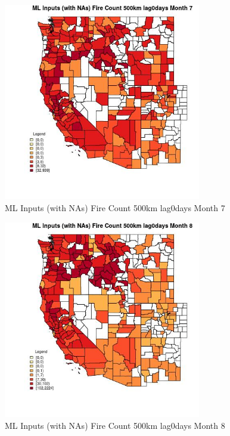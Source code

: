 \begin{figure} 
\centering  
\includegraphics[width=0.77\textwidth]{Code_Outputs/Report_ML_input_PM25_Step4_part_e_de_duplicated_aves_compiled_2019-05-20wNAs_CountyFire_Count_500km_lag0daysmedianMonth7.jpg} 
\caption{\label{fig:Report_ML_input_PM25_Step4_part_e_de_duplicated_aves_compiled_2019-05-20wNAsCountyFire_Count_500km_lag0daysmedianMonth7}ML Inputs (with NAs) Fire Count 500km lag0days Month 7} 
\end{figure} 
 

\begin{figure} 
\centering  
\includegraphics[width=0.77\textwidth]{Code_Outputs/Report_ML_input_PM25_Step4_part_e_de_duplicated_aves_compiled_2019-05-20wNAs_CountyFire_Count_500km_lag0daysmedianMonth8.jpg} 
\caption{\label{fig:Report_ML_input_PM25_Step4_part_e_de_duplicated_aves_compiled_2019-05-20wNAsCountyFire_Count_500km_lag0daysmedianMonth8}ML Inputs (with NAs) Fire Count 500km lag0days Month 8} 
\end{figure} 
 
